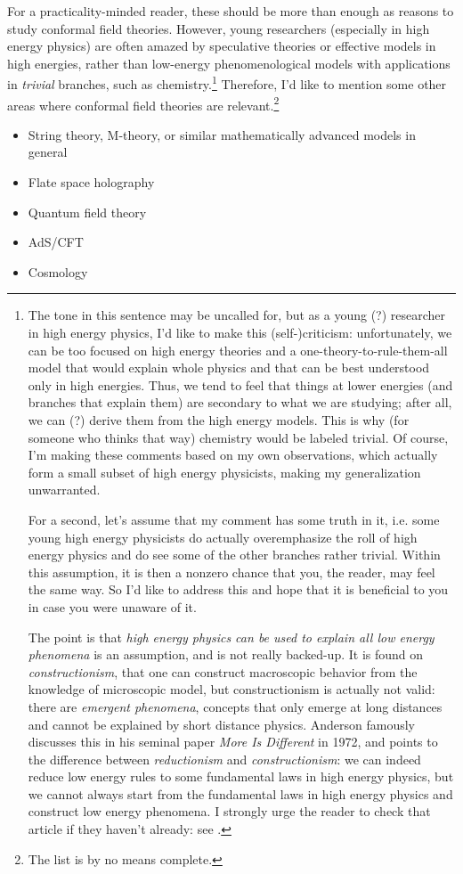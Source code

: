 For a practicality-minded reader, these should be more than enough as reasons to study conformal field theories. However, young researchers (especially in high energy physics) are often amazed by speculative theories or effective models in high energies, rather than low-energy phenomenological models with applications in \emph{trivial} branches, such as chemistry.\footnote{
	The tone in this sentence may be uncalled for, but as a young (?) researcher in high energy physics, I'd like to make this (self-)criticism: unfortunately, we can be too focused on high energy theories and a one-theory-to-rule-them-all model that would explain whole physics and that can be best understood only in high energies. Thus, we tend to feel that things at lower energies (and branches that explain them) are secondary to what we are studying; after all, we can (?) derive them from the high energy models. This is why (for someone who thinks that way) chemistry would be labeled trivial. Of course, I'm making these comments based on my own observations, which actually form a small subset of high energy physicists, making my generalization unwarranted.
	
	For a second, let's assume that my comment has some truth in it, i.e. some young high energy physicists do actually overemphasize the roll of high energy physics and do see some of the other branches rather trivial. Within this assumption, it is then a nonzero chance that you, the reader, may feel the same way. So I'd like to address this and hope that it is beneficial to you in case you were unaware of it.
	
	The point is that \emph{high energy physics can be used to explain all low energy phenomena} is an assumption, and is not really backed-up. It is found on \emph{constructionism}, that one can construct macroscopic behavior from the knowledge of microscopic model, but constructionism is actually not valid: there are \emph{emergent phenomena}, concepts that only emerge at long distances and cannot be explained by short distance physics. Anderson famously discusses this in his seminal paper \emph{More Is Different} in 1972, and points to the difference between \emph{reductionism} and \emph{constructionism}: we can indeed reduce low energy rules to some fundamental laws in high energy physics, but we cannot always start from the fundamental laws in high energy physics and construct low energy phenomena. I strongly urge the reader to check that article if they haven't already: see \cite{Anderson:1972pca}.
} Therefore, I'd like to mention some other areas where conformal field theories are relevant.\footnote{The list is by no means complete.}
\begin{itemize}
	\item String theory, M-theory, or similar mathematically advanced models in general
	\item Flate space holography
	\item Quantum field theory
	\item AdS/CFT
	\item Cosmology
\end{itemize}

